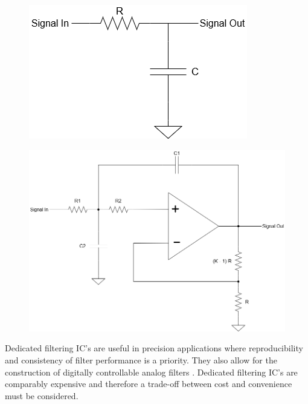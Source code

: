 \begin{figure}[H]
	\centering
	\begin{minipage}{.42\textwidth}
		\centering
		\includegraphics[width=.9\linewidth]{figures/litreview/filter_basic.png}
		\label{fig:filter_basic_lpf}
	\end{minipage}%
	\hfill
	\begin{minipage}{.54\textwidth}
		\centering
		\includegraphics[width=.9\linewidth]{figures/litreview/vcvs_filter.png}
		\label{fig:vcvs_filter_lpf}
	\end{minipage}
\end{figure}

Dedicated filtering IC's are useful in precision applications where reproducibility and consistency of filter performance is a priority. They also allow for the construction of digitally controllable analog filters \cite{Huijing2010}. Dedicated filtering IC's are comparably expensive and therefore a trade-off between cost and convenience must be considered.

